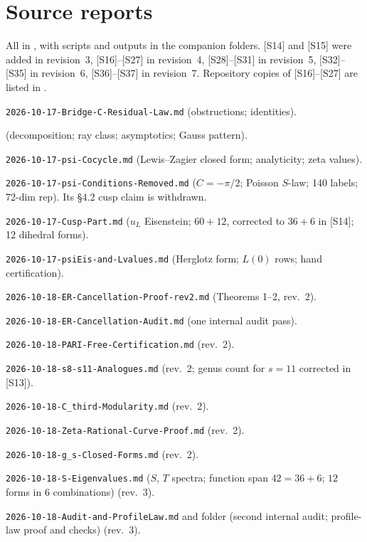 \documentclass[11pt]{article}
\theoremstyle{definition}
\theoremstyle{plain}
\begin{document}
\section*{Source reports}\label{sec:sources}
All in , with scripts and outputs in the companion folders. [S14] and [S15] were added in revision~3,
[S16]--[S27] in revision~4, [S28]--[S31] in revision~5, [S32]--[S35] in revision~6, [S36]--[S37] in revision~7. Repository copies of [S16]--[S27] are listed in .
\begin{enumerate}[label={[S\arabic*]},leftmargin=3em]
\item \texttt{2026-10-17-Bridge-C-Residual-Law.md} (obstructions; identities).
\item {} (decomposition; ray class; asymptotics; Gauss pattern).
\item \texttt{2026-10-17-psi-Cocycle.md} (Lewis--Zagier closed form; analyticity; zeta values).
\item \texttt{2026-10-17-psi-Conditions-Removed.md} ($C=-\pi/2$; Poisson $S$-law; 140 labels; 72-dim rep). Its \S4.2 cusp claim is withdrawn.
\item \texttt{2026-10-17-Cusp-Part.md} ($u_L$ Eisenstein; $60+12$, corrected to $36+6$ in [S14]; 12 dihedral forms).
\item \texttt{2026-10-17-psiEis-and-Lvalues.md} (Herglotz form; $L(0)$ rows; hand certification).
\item \texttt{2026-10-18-ER-Cancellation-Proof-rev2.md} (Theorems 1--2, rev.~2).
\item \texttt{2026-10-18-ER-Cancellation-Audit.md} (one internal audit pass).
\item \texttt{2026-10-18-PARI-Free-Certification.md} (rev.~2).
\item \texttt{2026-10-18-s8-s11-Analogues.md} (rev.~2; genus count for $s=11$ corrected in [S13]).
\item \texttt{2026-10-18-C\_third-Modularity.md} (rev.~2).
\item \texttt{2026-10-18-Zeta-Rational-Curve-Proof.md} (rev.~2).
\item \texttt{2026-10-18-g\_s-Closed-Forms.md} (rev.~2).
\item \texttt{2026-10-18-S-Eigenvalues.md} ($S$, $T$ spectra; function span $42=36+6$; $12$ forms in $6$ combinations) (rev.~3).
\item \texttt{2026-10-18-Audit-and-ProfileLaw.md} and folder  (second internal audit; profile-law proof and checks) (rev.~3).

\end{enumerate}
\end{document}
